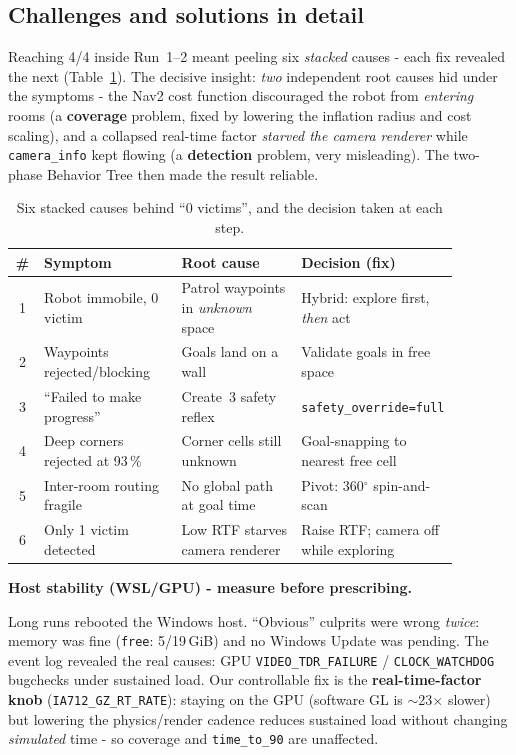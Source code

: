 \documentclass[11pt,a4paper]{article}
\newcommand{\head}[1]{\par\smallskip\noindent\textbf{\color{nccblue}#1}\par}
\begin{document}
\subsection*{Challenges and solutions in detail}
Reaching 4/4 inside Run~1--2 meant peeling six \emph{stacked} causes - each fix revealed the next
(Table~\ref{tab:bugs}). The decisive insight: \emph{two} independent root causes hid under the
symptoms - the Nav2 cost function discouraged the robot from \emph{entering} rooms (a
\textbf{coverage} problem, fixed by lowering the inflation radius and cost scaling), and a collapsed
real-time factor \emph{starved the camera renderer} while \texttt{camera\_info} kept flowing (a
\textbf{detection} problem, very misleading). The two-phase Behavior Tree then made the result reliable.

\begin{table}[htbp]\centering\footnotesize
\begin{tabular}{@{}cp{0.31\linewidth}p{0.27\linewidth}p{0.30\linewidth}@{}}
\toprule
\# & Symptom & Root cause & Decision (fix)\\
\midrule
1 & Robot immobile, 0 victim & Patrol waypoints in \emph{unknown} space & Hybrid: explore first, \emph{then} act\\
2 & Waypoints rejected/blocking & Goals land on a wall & Validate goals in free space\\
3 & ``Failed to make progress'' & Create~3 safety reflex & \texttt{safety\_override=full}\\
4 & Deep corners rejected at 93\,\% & Corner cells still unknown & Goal-snapping to nearest free cell\\
5 & Inter-room routing fragile & No global path at goal time & Pivot: 360$^\circ$ spin-and-scan\\
6 & Only 1 victim detected & Low RTF starves camera renderer & Raise RTF; camera off while exploring\\
\bottomrule
\end{tabular}
\caption{Six stacked causes behind ``0 victims'', and the decision taken at each step.}
\label{tab:bugs}
\end{table}

\head{Host stability (WSL/GPU) - measure before prescribing.} Long runs rebooted the Windows host.
``Obvious'' culprits were wrong \emph{twice}: memory was fine (\texttt{free}: 5/19\,GiB) and no Windows
Update was pending. The event log revealed the real causes: GPU \texttt{VIDEO\_TDR\_FAILURE} /
\texttt{CLOCK\_WATCHDOG} bugchecks under sustained load. Our controllable fix is the
\textbf{real-time-factor knob} (\texttt{IA712\_GZ\_RT\_RATE}): staying on the GPU (software GL is
$\sim$23$\times$ slower) but lowering the physics/render cadence reduces sustained load without changing
\emph{simulated} time - so coverage and \texttt{time\_to\_90} are unaffected.
\end{document}
